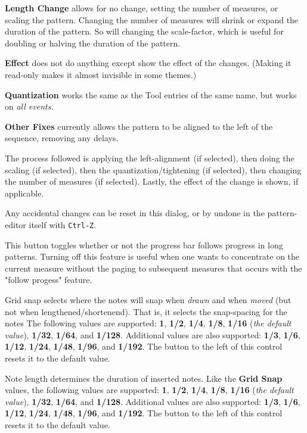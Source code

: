    \textbf{Length Change} allows for no change, setting the number of measures,
   or scaling the pattern.  Changing the number of measures will shrink or
   expand the duration of the pattern.  So will changing the scale-factor,
   which is useful for doubling or halving the duration of the pattern.

   \textbf{Effect} does not do anything except show the effect of the
   changes.  (Making it read-only makes it almost invisible in some themes.)

   \textbf{Quantization} works the same as the Tool entries of the same name,
   but works on \textsl{all events}.

   \textbf{Other Fixes} currently allows the pattern to be aligned to the left
   of the sequence, removing any delays.

   The process followed is applying the left-alignment (if selected), then
   doing the scaling (if selected), then the quantization/tightening (if
   selected), then changing the number of measures (if selected). Lastly, the
   effect of the change is shown, if applicable.

   Any accidental changes can be reset in this dialog, or by undone in the
   pattern-editor itself with \texttt{Ctrl-Z}.

   This button toggles whether or not the progress bar follows
   progress in long patterns.  Turning off this feature is useful when
   one wants to concentrate on the current measure without the paging to
   subsequent measures that occurs with the "follow progess" feature.

   Grid snap selects where the notes will snap when
   \textsl{drawn} and when \textsl{moved} (but not when lengthened/shortenend).
   That is, it selects the snap-spacing for the notes
   The following values are supported:
   \textbf{1}, \textbf{1/2}, \textbf{1/4}, \textbf{1/8},
   \textbf{1/16} (\textsl{the default value}),
   \textbf{1/32}, \textbf{1/64}, and \textbf{1/128}.
   Additional values are also supported:
   \textbf{1/3}, \textbf{1/6}, \textbf{1/12}, \textbf{1/24},
   \textbf{1/48}, \textbf{1/96}, and \textbf{1/192}.
   The button to the left of this control resets it to the default value.

   Note length determines the duration of inserted notes.
   Like the \textbf{Grid Snap} values,
   the following values are supported:
   \textbf{1}, \textbf{1/2}, \textbf{1/4}, \textbf{1/8},
   \textbf{1/16} (\textsl{the default value}),
   \textbf{1/32}, \textbf{1/64}, and \textbf{1/128}.
   Additional values are also supported:
   \textbf{1/3}, \textbf{1/6}, \textbf{1/12}, \textbf{1/24},
   \textbf{1/48}, \textbf{1/96}, and \textbf{1/192}.
   The button to the left of this control resets it to the default value.

